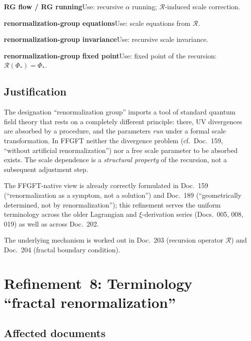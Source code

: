 \smallskip\noindent \textbf{RG flow / RG running}\quad Use: recursive $\alpha$ running; $\mathcal{R}$-induced scale correction.

\smallskip\noindent \textbf{renormalization-group equations}\quad Use: scale equations from $\mathcal{R}$.

\smallskip\noindent \textbf{renormalization-group invariance}\quad Use: recursive scale invariance.

\smallskip\noindent \textbf{renormalization-group fixed point}\quad Use: fixed point of the recursion: $\mathcal{R}(\Phi_*) = \Phi_*$.

\medskip


\subsection*{Justification}

The designation \enquote{renormalization group} imports a tool of standard
quantum field theory that rests on a completely different principle: there, UV
divergences are absorbed by a procedure, and the parameters \emph{run} under a
formal scale transformation. In FFGFT neither the divergence problem (cf.\
Doc.~159, \enquote{without artificial renormalization}) nor a free scale
parameter to be absorbed exists. The scale dependence is a \emph{structural
property} of the recursion, not a subsequent adjustment step.

The FFGFT-native view is already correctly formulated in Doc.~159
(\enquote{renormalization as a symptom, not a solution}) and Doc.~189
(\enquote{geometrically determined, not by renormalization}); this refinement
serves the uniform terminology across the older Lagrangian and $\xi$-derivation
series (Docs.~005, 008, 019) as well as across Doc.~202.

The underlying mechanism is worked out in Doc.~203 (recursion operator
$\mathcal{R}$) and Doc.~204 (fractal boundary condition).

\section{\texorpdfstring{Refinement~8: Terminology \enquote{fractal renormalization}}{Refinement 8: Terminology fractal renormalization}}

\subsection*{Affected documents}

